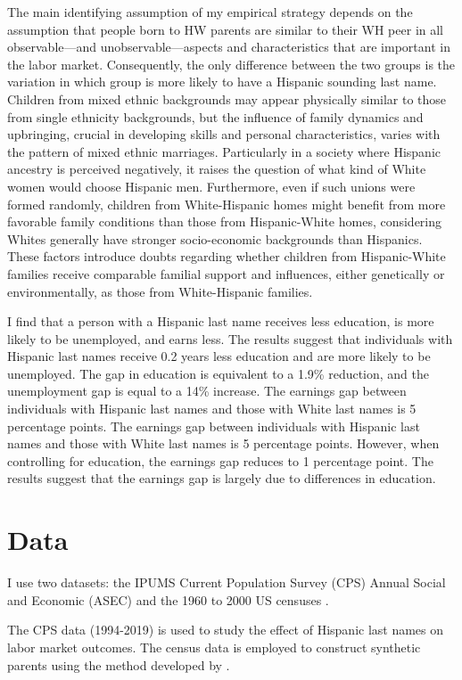 \documentclass[a4paper,fleqn]{cas-sc}
\begin{document}
The main identifying assumption of my empirical strategy depends on the assumption that people born to HW parents are similar to their WH peer in all observable---and unobservable---aspects and characteristics that are important in the labor market. Consequently, the only difference between the two groups is the variation in which group is more likely to have a Hispanic sounding last name. Children from mixed ethnic backgrounds may appear physically similar to those from single ethnicity backgrounds, but the influence of family dynamics and upbringing, crucial in developing skills and personal characteristics, varies with the pattern of mixed ethnic marriages. Particularly in a society where Hispanic ancestry is perceived negatively, it raises the question of what kind of White women would choose Hispanic men. Furthermore, even if such unions were formed randomly, children from White-Hispanic homes might benefit from more favorable family conditions than those from Hispanic-White homes, considering Whites generally have stronger socio-economic backgrounds than Hispanics. These factors introduce doubts regarding whether children from Hispanic-White families receive comparable familial support and influences, either genetically or environmentally, as those from White-Hispanic families.

I find that a person with a Hispanic last name receives less education, is more likely to be unemployed, and earns less. The results suggest that individuals with Hispanic last names receive 0.2 years less education and are more likely to be unemployed. The gap in education is equivalent to a 1.9\% reduction, and the unemployment gap is equal to a 14\% increase. The earnings gap between individuals with Hispanic last names and those with White last names is 5 percentage points. The earnings gap between individuals with Hispanic last names and those with White last names is 5 percentage points. However, when controlling for education, the earnings gap reduces to 1 percentage point. The results suggest that the earnings gap is largely due to differences in education.

\section{Data}\label{sec:data}

I use two datasets: the IPUMS Current Population Survey (CPS) Annual Social and Economic (ASEC) \citep{cps2019} and the 1960 to 2000 US censuses \citep{acs2019}.

The CPS data (1994-2019) is used to study the effect of Hispanic last names on labor market outcomes. The census data is employed to construct synthetic parents using the method developed by \citet{rubinstein2014pride}.
\end{document}
